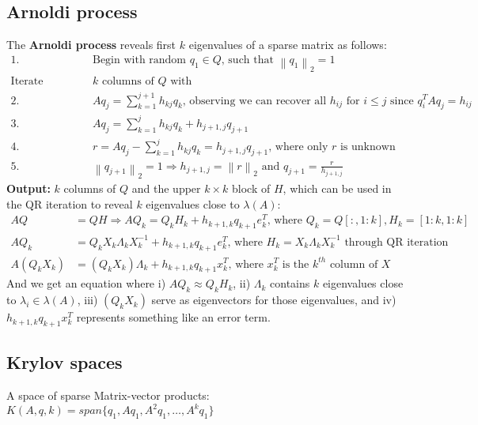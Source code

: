 \documentclass{article}
\newcommand{\norm}[2]{\left\lVert#1\right\rVert_#2}
\begin{document}
\subsection{Arnoldi process}
The \textbf{Arnoldi process} reveals first $k$ eigenvalues of a sparse matrix as follows:
\begin{align*}
    1. \; & \textrm{Begin with random } q_1 \in Q \textrm{, such that } \norm{q_1}{2} = 1\\
    \textrm{Iterate through each of the first } & k \textrm{ columns of $Q$ with }\\
    2. \; & Aq_j = \sum_{k = 1}^{j+1} h_{kj}q_k \textrm{, observing we can recover all $h_{ij}$ for $i \leq j$ since } q_i^TAq_j = h_{ij}\\
    3. \; & Aq_j = \sum_{k = 1}^{j} h_{kj}q_k + h_{j+1, j}q_{j+1}\\
    4. \; & r = Aq_j - \sum_{k = 1}^{j} h_{kj}q_k = h_{j+1, j}q_{j+1} \textrm{, where only $r$ is unknown}\\
    5. \;& \norm{q_{j+1}}{2} = 1 \Longrightarrow h_{j+1, j} = \norm{r}{2} \textrm{ and } q_{j+1} = \frac{r}{h_{j+1, j}}
\end{align*}
\textbf{Output:} $k$ columns of $Q$ and the upper $k \times k$ block of $H$, which can be used in the QR iteration to reveal $k$ eigenvalues close to $\lambda(A)$:
\begin{align*}
    AQ &= QH \Longrightarrow AQ_k = Q_kH_k + h_{k+1,k}q_{k+1}e_k^T \textrm{, where } Q_k = Q[:, 1:k], H_k = [1:k, 1:k]\\
    AQ_k &= Q_kX_k\Lambda_k X_k^{-1} + h_{k+1,k}q_{k+1}e_k^T \textrm{, where } H_k = X_k\Lambda_k X_k^{-1} \textrm{ through QR iteration}\\
    A(Q_kX_k) &= (Q_kX_k)\Lambda_k + h_{k+1,k}q_{k+1}x_k^T \textrm{, where } x_k^T \textrm{ is the $k^{th}$ column of } X
\end{align*}
And we get an equation where i) $AQ_k \approx Q_kH_k$, ii) $\Lambda_k$ contains $k$ eigenvalues close to $\lambda_i \in \lambda(A)$, iii) $(Q_kX_k)$ serve as eigenvectors for those eigenvalues, and iv) $h_{k+1,k}q_{k+1}x_k^T$ represents something like an error term.

\subsection{Krylov spaces}
A space of sparse Matrix-vector products: $K(A, q, k) = span\{q_1, Aq_1, A^2q_1, \dots, A^kq_1 \}$
\end{document}
